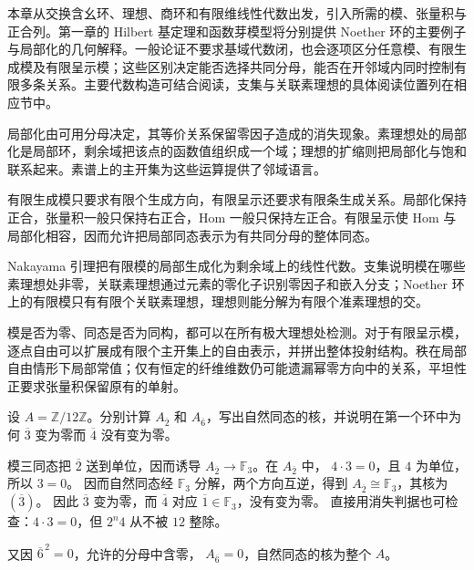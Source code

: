 \ProseParagraphBreak

本章从交换含幺环、理想、商环和有限维线性代数出发，引入所需的模、张量积与正合列。第一章的 Hilbert 基定理和函数芽模型将分别提供 Noether 环的主要例子与局部化的几何解释。一般论证不要求基域代数闭，也会逐项区分任意模、有限生成模及有限呈示模；这些区别决定能否选择共同分母，能否在开邻域内同时控制有限多条关系。主要代数构造可结合\cite[第2、4节]{Matsumura1989}阅读，支集与关联素理想的具体阅读位置列在相应节中。







\begin{chaptersummary}
	局部化由可用分母决定，其等价关系保留零因子造成的消失现象。素理想处的局部化是局部环，剩余域把该点的函数值组织成一个域；理想的扩缩则把局部化与饱和联系起来。素谱上的主开集为这些运算提供了邻域语言。

	\ProseParagraphBreak

	有限生成模只要求有限个生成方向，有限呈示还要求有限条生成关系。局部化保持正合，张量积一般只保持右正合，Hom 一般只保持左正合。有限呈示使 Hom 与局部化相容，因而允许把局部同态表示为有共同分母的整体同态。

	\ProseParagraphBreak

	Nakayama 引理把有限模的局部生成化为剩余域上的线性代数。支集说明模在哪些素理想处非零，关联素理想通过元素的零化子识别零因子和嵌入分支；Noether 环上的有限模只有有限个关联素理想，理想则能分解为有限个准素理想的交。

	\ProseParagraphBreak

	模是否为零、同态是否为同构，都可以在所有极大理想处检测。对于有限呈示模，逐点自由可以扩展成有限个主开集上的自由表示，并拼出整体投射结构。秩在局部自由情形下局部常值；仅有恒定的纤维维数仍可能遗漏幂零方向中的关系，平坦性正要求张量积保留原有的单射。
\end{chaptersummary}

\BookExercises

\begin{exercise}\label{g5:ex:localize-twelve}
	设 \(A=\mathbb Z/12\mathbb Z\)。分别计算 \(A_{\overline2}\) 和 \(A_{\overline6}\)，写出自然同态的核，并说明在第一个环中为何 \(\overline3\) 变为零而 \(\overline4\) 没有变为零。
\end{exercise}
\begin{solution}
	模三同态把 \(\overline2\) 送到单位，因而诱导 \(A_{\overline2}\to\mathbb F_3\)。在 \(A_{\overline2}\) 中， \(4\cdot3=0\)，且 \(4\) 为单位，所以 \(3=0\)。 因而自然同态经 \(\mathbb F_3\) 分解，两个方向互逆，得到 \(A_{\overline2}\cong\mathbb F_3\)，其核为 \((\overline3)\)。 因此 \(\overline3\) 变为零，而 \(\overline4\) 对应 \(\overline1\in\mathbb F_3\)，没有变为零。 直接用消失判据也可检查：\(4\cdot3=0\)，但 \(2^n4\) 从不被 \(12\) 整除。

	又因 \(\overline6^{\,2}=0\)，允许的分母中含零， \(A_{\overline6}=0\)，自然同态的核为整个 \(A\)。
\end{solution}


